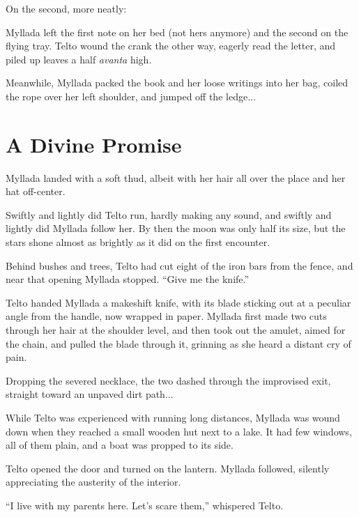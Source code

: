 On the second, more neatly:


Myllada left the first note on her bed (not hers anymore) and the second on the flying tray. Telto wound the crank the other way, eagerly read the letter, and piled up leaves a half \emph{avanta} high.

Meanwhile, Myllada packed the book and her loose writings into her bag, coiled the rope over her left shoulder, and jumped off the ledge...

\chapter{A Divine Promise}

Myllada landed with a soft thud, albeit with her hair all over the place and her hat off-center.

Swiftly and lightly did Telto run, hardly making any sound, and swiftly and lightly did Myllada follow her. By then the moon was only half its size, but the stars shone almost as brightly as it did on the first encounter.

Behind bushes and trees, Telto had cut eight of the iron bars from the fence, and near that opening Myllada stopped. ``Give me the knife.''

Telto handed Myllada a makeshift knife, with its blade sticking out at a peculiar angle from the handle, now wrapped in paper. Myllada first made two cuts through her hair at the shoulder level, and then took out the amulet, aimed for the chain, and pulled the blade through it, grinning as she heard a distant cry of pain.

Dropping the severed necklace, the two dashed through the improvised exit, straight toward an unpaved dirt path...

\centeredstars

While Telto was experienced with running long distances, Myllada was wound down when they reached a small wooden hut next to a lake. It had few windows, all of them plain, and a boat was propped to its side.

Telto opened the door and turned on the lantern. Myllada followed, silently appreciating the austerity of the interior.

``I live with my parents here. Let's scare them,'' whispered Telto.

